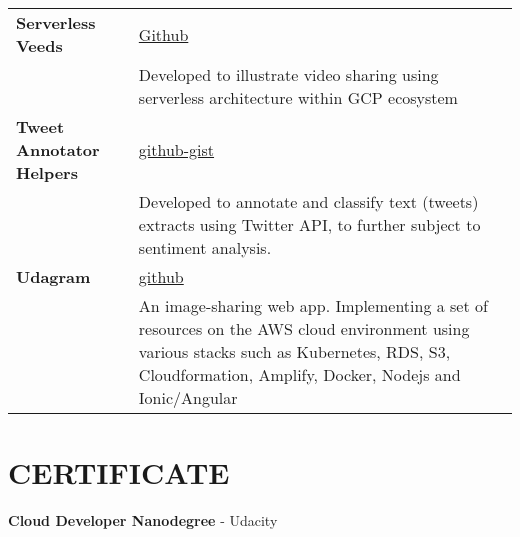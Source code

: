 \documentclass[a4paper,12pt]{article}
\begin{document}
\begin{tabularx}{\linewidth}{@{}l X@{}}
\textbf{Serverless Veeds} & \hfill \href{https://github.com/nully0x/serverless-veeds}{Github} \\
& Developed to illustrate video sharing using serverless architecture within GCP ecosystem\\[10pt]
\textbf{Tweet Annotator Helpers} & \hfill \href{https://github-gist.com}{github-gist} \\
& Developed to annotate and classify text (tweets) extracts using Twitter API, to further subject to sentiment analysis. \\[10pt]
\textbf{Udagram} & \hfill \href{https://github.com}{github} \\
& An image-sharing web app. Implementing a set of resources on the AWS cloud environment using various stacks such as Kubernetes, RDS, S3, Cloudformation, Amplify, Docker, Nodejs and Ionic/Angular
\end{tabularx}

\section{CERTIFICATE}
\textbf{Cloud Developer Nanodegree} - Udacity

\vfill
{}
\end{document}
